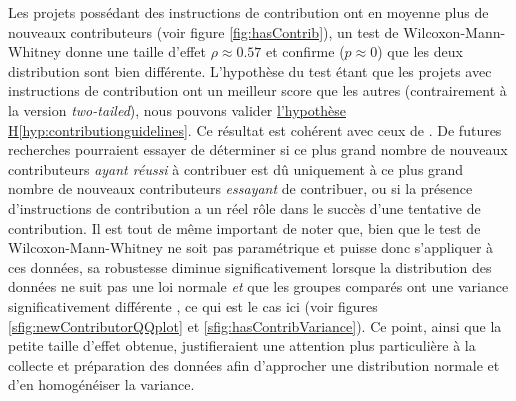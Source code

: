 \documentclass[dvipsnames,runningheads]{llncs}
\newcommand{\en}[1]{\foreignlanguage{english}{\emph{#1}}}
\begin{document}
    Les projets possédant des instructions de contribution ont en moyenne plus de nouveaux contributeurs (voir
    figure \ref{fig:hasContrib}), un test de Wilcoxon-Mann-Whitney donne une taille d'effet $\rho \approx
    0.57$ et confirme ($p \approx 0$) que les deux distribution sont bien différente. L'hypothèse du test
    étant que les projets avec instructions de contribution ont un meilleur score que les autres
    (contrairement à la version \en{two-tailed}), nous pouvons valider
    \hyperref[hyp:contributionguidelines]{l'hypothèse H\ref*{hyp:contributionguidelines}}. Ce résultat est
    cohérent avec ceux de \textcite[p.~11]{signals-2019}. De futures recherches pourraient essayer de
    déterminer si ce plus grand nombre de nouveaux contributeurs \emph{ayant réussi} à contribuer est dû
    uniquement à ce plus grand nombre de nouveaux contributeurs \emph{essayant} de contribuer, ou si la
    présence d'instructions de contribution a un réel rôle dans le succès d'une tentative de contribution. Il
    est tout de même important de noter que, bien que le test de Wilcoxon-Mann-Whitney ne soit pas
    paramétrique et puisse donc s'appliquer à ces données, sa robustesse diminue significativement lorsque la
    distribution des données ne suit pas une loi normale \emph{et} que les groupes comparés ont une variance
    significativement différente \parencite{WMW-robustness-1998}, ce qui est le cas ici (voir figures
    \ref{sfig:newContributorQQplot} et \ref{sfig:hasContribVariance}). Ce point, ainsi que la petite taille
    d'effet obtenue, justifieraient une attention plus particulière à la collecte et préparation des données
    afin d'approcher une distribution normale et d'en homogénéiser la variance.
\end{document}
